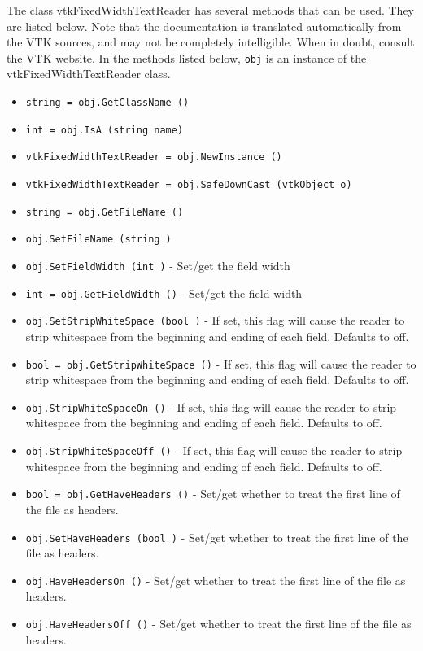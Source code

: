 The class vtkFixedWidthTextReader has several methods that can be used.
  They are listed below.
Note that the documentation is translated automatically from the VTK sources,
and may not be completely intelligible.  When in doubt, consult the VTK website.
In the methods listed below, \verb|obj| is an instance of the vtkFixedWidthTextReader class.
\begin{itemize}
\item  \verb|string = obj.GetClassName ()|

\item  \verb|int = obj.IsA (string name)|

\item  \verb|vtkFixedWidthTextReader = obj.NewInstance ()|

\item  \verb|vtkFixedWidthTextReader = obj.SafeDownCast (vtkObject o)|

\item  \verb|string = obj.GetFileName ()|

\item  \verb|obj.SetFileName (string )|

\item  \verb|obj.SetFieldWidth (int )| -  Set/get the field width

\item  \verb|int = obj.GetFieldWidth ()| -  Set/get the field width

\item  \verb|obj.SetStripWhiteSpace (bool )| -  If set, this flag will cause the reader to strip whitespace from
 the beginning and ending of each field.  Defaults to off.

\item  \verb|bool = obj.GetStripWhiteSpace ()| -  If set, this flag will cause the reader to strip whitespace from
 the beginning and ending of each field.  Defaults to off.

\item  \verb|obj.StripWhiteSpaceOn ()| -  If set, this flag will cause the reader to strip whitespace from
 the beginning and ending of each field.  Defaults to off.

\item  \verb|obj.StripWhiteSpaceOff ()| -  If set, this flag will cause the reader to strip whitespace from
 the beginning and ending of each field.  Defaults to off.

\item  \verb|bool = obj.GetHaveHeaders ()| -  Set/get whether to treat the first line of the file as headers.

\item  \verb|obj.SetHaveHeaders (bool )| -  Set/get whether to treat the first line of the file as headers.

\item  \verb|obj.HaveHeadersOn ()| -  Set/get whether to treat the first line of the file as headers.

\item  \verb|obj.HaveHeadersOff ()| -  Set/get whether to treat the first line of the file as headers.

\end{itemize}
